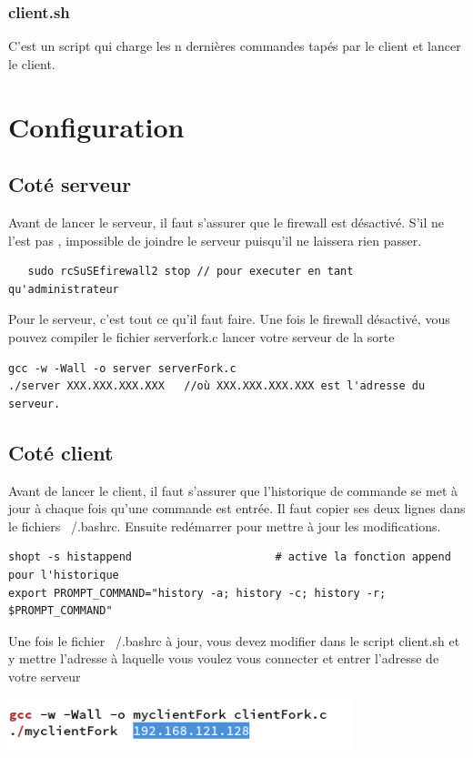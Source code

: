 \documentclass[a4paper,11pt]{report}
\begin{document}
\subsection{client.sh}

C'est un script qui charge les n dernières commandes tapés par le client et lancer le client. 


\chapter{Configuration}

\section{Coté serveur}
Avant de lancer le serveur, il faut s'assurer que le firewall est désactivé. S'il ne l'est pas , impossible de joindre le serveur puisqu'il ne laissera rien passer.
\begin{lstlisting} 
   sudo rcSuSEfirewall2 stop // pour executer en tant qu'administrateur
\end{lstlisting}
Pour le serveur, c'est tout ce qu'il faut faire.
Une fois le firewall désactivé, vous pouvez compiler le fichier serverfork.c lancer votre serveur de la sorte 
\begin{lstlisting} 
gcc -w -Wall -o server serverFork.c
./server XXX.XXX.XXX.XXX   //où XXX.XXX.XXX.XXX est l'adresse du serveur.
\end{lstlisting}




\section{Coté client}
Avant de lancer le client, il faut s'assurer que l'historique de commande se met à jour à chaque fois qu'une commande est entrée. Il faut copier ses deux lignes dans le fichiers ~/.bashrc. Ensuite redémarrer pour mettre à jour les modifications.
\begin{lstlisting} 
shopt -s histappend                      # active la fonction append pour l'historique
export PROMPT_COMMAND="history -a; history -c; history -r; $PROMPT_COMMAND"
\end{lstlisting}
Une fois le fichier ~/.bashrc à jour, vous devez modifier dans le script client.sh et y mettre l'adresse à laquelle vous voulez vous connecter et entrer l'adresse de votre serveur 

\includegraphics[width=100mm]{./resources/adresseServeur.png}
\end{document}
